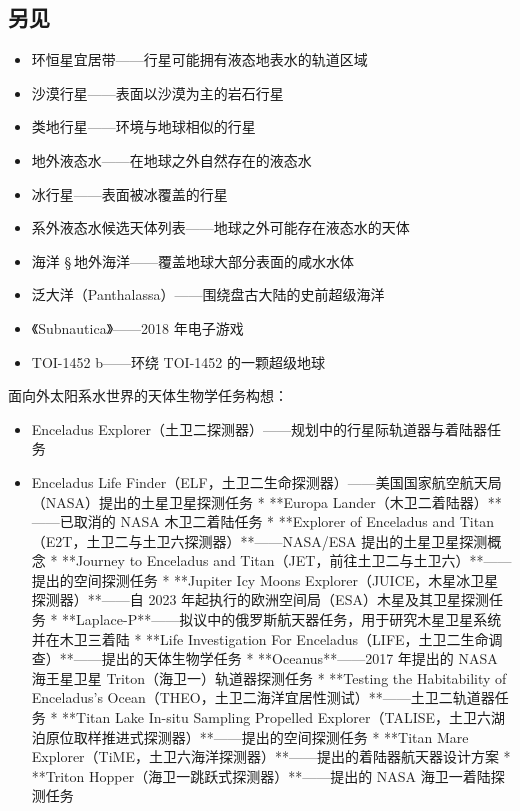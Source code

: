 \subsection{另见}
\begin{itemize}
\item 环恒星宜居带——行星可能拥有液态地表水的轨道区域
\item 沙漠行星——表面以沙漠为主的岩石行星
\item 类地行星——环境与地球相似的行星
\item 地外液态水——在地球之外自然存在的液态水
\item 冰行星——表面被冰覆盖的行星
\item 系外液态水候选天体列表——地球之外可能存在液态水的天体
\item 海洋 § 地外海洋——覆盖地球大部分表面的咸水水体
\item 泛大洋（Panthalassa）——围绕盘古大陆的史前超级海洋
\item 《Subnautica》——2018 年电子游戏
\item TOI-1452 b——环绕 TOI-1452 的一颗超级地球
\end{itemize}
面向外太阳系水世界的天体生物学任务构想：

\begin{itemize}
\item Enceladus Explorer（土卫二探测器）——规划中的行星际轨道器与着陆器任务
\item Enceladus Life Finder（ELF，土卫二生命探测器）——美国国家航空航天局（NASA）提出的土星卫星探测任务
* **Europa Lander（木卫二着陆器）**——已取消的 NASA 木卫二着陆任务
* **Explorer of Enceladus and Titan（E2T，土卫二与土卫六探测器）**——NASA/ESA 提出的土星卫星探测概念
* **Journey to Enceladus and Titan（JET，前往土卫二与土卫六）**——提出的空间探测任务
* **Jupiter Icy Moons Explorer（JUICE，木星冰卫星探测器）**——自 2023 年起执行的欧洲空间局（ESA）木星及其卫星探测任务
* **Laplace-P**——拟议中的俄罗斯航天器任务，用于研究木星卫星系统并在木卫三着陆
* **Life Investigation For Enceladus（LIFE，土卫二生命调查）**——提出的天体生物学任务
* **Oceanus**——2017 年提出的 NASA 海王星卫星 Triton（海卫一）轨道器探测任务
* **Testing the Habitability of Enceladus's Ocean（THEO，土卫二海洋宜居性测试）**——土卫二轨道器任务
* **Titan Lake In-situ Sampling Propelled Explorer（TALISE，土卫六湖泊原位取样推进式探测器）**——提出的空间探测任务
* **Titan Mare Explorer（TiME，土卫六海洋探测器）**——提出的着陆器航天器设计方案
* **Triton Hopper（海卫一跳跃式探测器）**——提出的 NASA 海卫一着陆探测任务

\end{itemize}